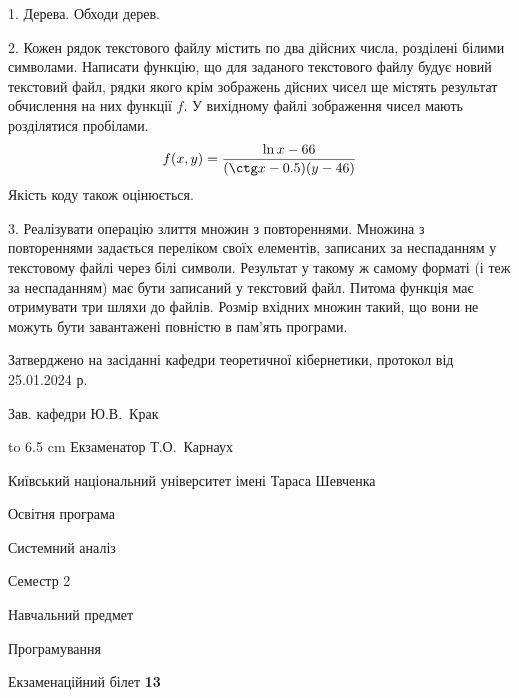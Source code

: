 \documentclass[12pt, ukrainian]{article}
\begin{document}
{%
1. Дерева. Обходи дерев.%
\par
\vspace{2mm}

2. Кожен рядок текстового файлу містить по два дійсних числа, розділені білими символами.
Написати функцію, що для заданого текстового файлу будує новий текстовий файл, рядки якого крім зображень дйсних чисел ще містять результат обчислення на них функції $f$. У вихідному файлі зображення чисел мають розділятися пробілами. 
$$f(x, y) =\frac{\ln x - 66}{(\ctg x - 0.5) (y - 46)}$$ 
Якість коду також оцінюється.

\par
\vspace{2mm}

3. Реалізувати операцію злиття множин з повтореннями. Множина з повтореннями задається переліком своїх елементів, записаних за неспаданням у текстовому файлі через білі символи. Результат у такому ж самому форматі (і теж за неспаданням) має бути записаний у текстовий файл. Питома функція має отримувати три шляхи до файлів. Розмір вхідних множин такий, що вони не можуть бути завантажені повністю в пам’ять програми.

}
{\smallskip\smallskip \begin {scriptsize} Затверджено на засіданні кафедри теоретичної кібернетики, протокол   від   25.01.2024 р.\par\smallskip\smallskip\smallskip\smallskip
{\parbox {6.5 cm} {Зав. кафедри \dotfill Ю.В.~Крак}}\hspace {0.7cm} {\hbox to 6.5 cm { Екзаменатор \dotfill Т.О.~Карнаух}} \end{scriptsize}}
\newpage
{{\begin {scriptsize}\par
{ \center  Київський національний університет імені Тараса Шевченка \par}
{\parbox {5 cm}{Освітня програма \hfill}{\parbox {7 cm}{Системний аналіз\hfill}}\parbox {6 cm}{\hfill Семестр 2}}\par
{\parbox {5 cm} {Навчальний предмет \hfill}\parbox {7 cm}{Програмування \hfill}\parbox {6cm}{\hfill}\par}\vspace{-15pt} \end{scriptsize}}{\center Екзаменаційний білет \No \textbf { 13 }\par}}
\end{document}
